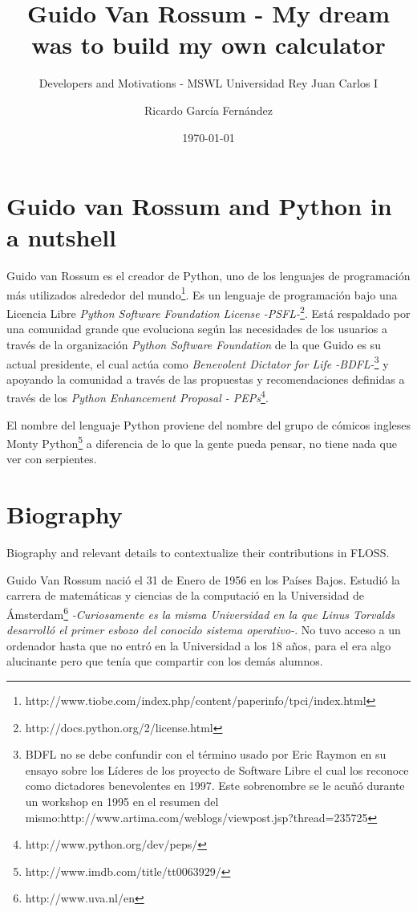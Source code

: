 \documentclass[11pt]{scrartcl}
\title{\textbf{Guido Van Rossum - My dream was to build my own calculator}}
\subtitle{Developers and Motivations - MSWL Universidad Rey Juan Carlos I}
\author{Ricardo García Fernández}
\date{\today}
\begin{document}
\maketitle

\newpage

\tableofcontents

\newpage

\section{Guido van Rossum and Python in a nutshell}

Guido van Rossum es el creador de Python, uno de los lenguajes de programación más utilizados alrededor del mundo\footnote{http://www.tiobe.com/index.php/content/paperinfo/tpci/index.html}. Es un lenguaje de programación bajo una Licencia Libre \emph{Python Software Foundation License -PSFL-}\footnote{http://docs.python.org/2/license.html}. Está respaldado por una comunidad grande que evoluciona según las necesidades de los usuarios a través de la organización \emph{Python Software Foundation} de la que Guido es su actual presidente, el cual actúa como \emph{Benevolent Dictator for Life -BDFL-}\footnote{BDFL no se debe confundir con el término usado por Eric Raymon en su ensayo sobre los Líderes de los proyecto de Software Libre el cual los reconoce como dictadores benevolentes en 1997. Este sobrenombre se le acuñó durante un workshop en 1995 en el resumen del mismo:http://www.artima.com/weblogs/viewpost.jsp?thread=235725} y apoyando la comunidad a través de las propuestas y recomendaciones definidas a través de los \emph{Python Enhancement Proposal - PEPs}\footnote{http://www.python.org/dev/peps/}.

El nombre del lenguaje Python proviene del nombre del grupo de cómicos ingleses Monty Python\footnote{http://www.imdb.com/title/tt0063929/} a diferencia de lo que la gente pueda pensar, no tiene nada que ver con serpientes.

\section{Biography}

Biography and relevant details to contextualize their contributions in FLOSS.

Guido Van Rossum nació el 31 de Enero de 1956 en los Países Bajos. Estudió la carrera de matemáticas y ciencias de la computació en la Universidad de Ámsterdam\footnote{http://www.uva.nl/en} \emph{-Curiosamente es la misma Universidad en la que Linus Torvalds desarrolló el primer esbozo del conocido sistema operativo-}.
No tuvo acceso a un ordenador hasta que no entró en la Universidad a los 18 años, para el era algo alucinante pero que tenía que compartir con los demás alumnos.
\end{document}
